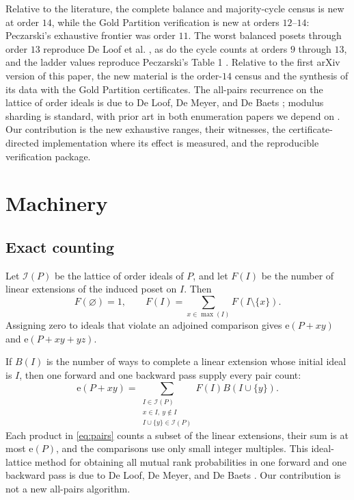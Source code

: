 \documentclass[11pt]{article}
\theoremstyle{definition}
\newcommand{\ext}{\mathrm{e}}
\begin{document}
Relative to the literature, the complete balance and majority-cycle census is
new at order $14$, while the Gold Partition verification is new at orders
$12$--$14$: Peczarski's exhaustive frontier was order $11$.  The worst
balanced posets through order $13$ reproduce De Loof et al.
\cite[\S4.2.2]{deloof-census}, as do the cycle counts at orders $9$ through
$13$, and the ladder values reproduce Peczarski's Table 1
\cite{peczarski-ladders}.  Relative to the first arXiv version of this paper,
the new material is the order-$14$ census and the synthesis of its data with
the Gold Partition certificates.  The all-pairs recurrence on the lattice of
order ideals is due to De Loof, De Meyer, and De Baets
\cite{deloof-ideals}; modulus sharding is standard, with prior art in both
enumeration papers we depend on \cite{brinkmann-mckay,deloof-census}.  Our
contribution is the new exhaustive ranges, their witnesses, the
certificate-directed implementation where its effect is measured, and the
reproducible verification package.

\section{Machinery}\label{sec:counting}

\subsection{Exact counting}

Let $\mathcal I(P)$ be the lattice of order ideals of $P$, and let $F(I)$ be
the number of linear extensions of the induced poset on $I$.  Then
\begin{equation}\label{eq:forward}
  F(\varnothing)=1,\qquad
  F(I)=\sum_{x\in\max(I)}F(I\setminus\{x\}).
\end{equation}
Assigning zero to ideals that violate an adjoined comparison gives
$\ext(P+xy)$ and $\ext(P+xy+yz)$.

If $B(I)$ is the number of ways to complete a linear extension whose initial
ideal is $I$, then one forward and one backward pass supply every pair count:
\begin{equation}\label{eq:pairs}
  \ext(P+xy)=
  \sum_{\substack{I\in\mathcal I(P)\\
                  x\in I,\ y\notin I\\
                  I\cup\{y\}\in\mathcal I(P)}}
        F(I)B(I\cup\{y\}).
\end{equation}
Each product in \eqref{eq:pairs} counts a subset of the linear extensions,
their sum is at most $\ext(P)$, and the comparisons use only small integer
multiples.  This ideal-lattice method for obtaining all mutual rank
probabilities in one forward and one backward pass is due to De Loof,
De Meyer, and De Baets \cite{deloof-ideals}.  Our contribution is not a new
all-pairs algorithm.
\end{document}
